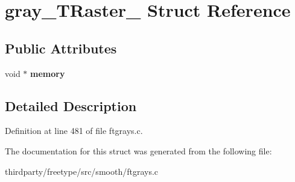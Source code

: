 \hypertarget{structgray___t_raster__}{}\section{gray\+\_\+\+T\+Raster\+\_\+ Struct Reference}
\label{structgray___t_raster__}
\subsection*{Public Attributes}
\begin{DoxyCompactItemize}
\item 
\mbox{\label{structgray___t_raster___a0c3c49aa10fa5c1e8c6e40199b04ff87}} 
void $\ast$ {\bfseries memory}
\end{DoxyCompactItemize}


\subsection{Detailed Description}


Definition at line 481 of file ftgrays.\+c.



The documentation for this struct was generated from the following file\+:\begin{DoxyCompactItemize}
\item 
thirdparty/freetype/src/smooth/ftgrays.\+c\end{DoxyCompactItemize}
